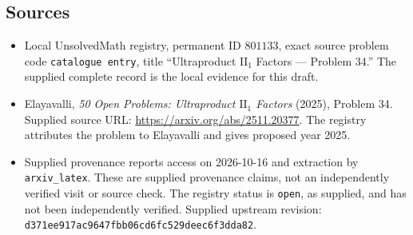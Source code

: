 \documentclass[11pt]{article}
\begin{document}
\subsection{Sources}
\begin{itemize}
\item Local UnsolvedMath registry, permanent ID \(801133\), exact source problem code \texttt{catalogue entry}, title ``Ultraproduct \(\mathrm{II}_1\) Factors --- Problem 34.'' The supplied complete record is the local evidence for this draft.
\item Elayavalli, \emph{50 Open Problems: Ultraproduct \(\mathrm{II}_1\) Factors} (2025), Problem 34. Supplied source URL: \url{https://arxiv.org/abs/2511.20377}. The registry attributes the problem to Elayavalli and gives proposed year 2025.
\item Supplied provenance reports access on 2026-10-16 and extraction by \texttt{arxiv\_latex}. These are supplied provenance claims, not an independently verified visit or source check. The registry status is \texttt{open}, as supplied, and has not been independently verified. Supplied upstream revision: \texttt{d371ee917ac9647fbb06cd6fc529deec6f3dda82}.
\end{itemize}
\end{document}

